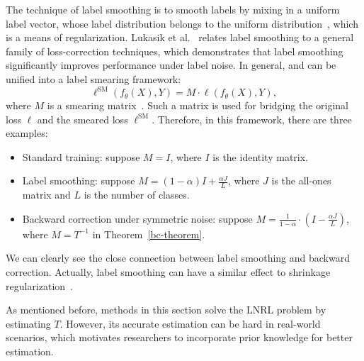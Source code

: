 \label{label-smoothing}
The technique of label smoothing is to smooth labels by mixing in a uniform label vector, whose label distribution belongs to the uniform distribution~, which is a means of regularization. Lukasik et al.~ relates label smoothing to a general family of loss-correction techniques, 
which demonstrates that label smoothing significantly improves performance under label noise. 
In general,  and  can be unified into a label smearing framework:
\begin{equation*}
\ell^{\text{SM}}(f_{\theta}(X),Y) 
= M \cdot \ell(f_{\theta}(X),Y),
\end{equation*}
where $M$ is a smearing matrix~. Such a matrix is used for bridging the original loss $\ell$ and the smeared loss $\ell^{\text{SM}}$.
Therefore, in this framework, there are three examples:
\begin{itemize}[leftmargin=*]
\item Standard training: suppose $M = I$, where $I$ is the identity matrix.
\item Label smoothing: suppose $M = (1-\alpha) I + \frac{\alpha J}{L} $, where $J$ is the all-ones matrix and $L$ is the number of classes.
\item Backward correction under symmetric noise: suppose $M = \frac{1}{1-\alpha}\cdot(I - \frac{\alpha J}{L})$, where $M = T^{-1}$ in Theorem~\ref{bc-theorem}. 
\end{itemize}
We can clearly see the close connection between label smoothing and backward correction. Actually, label smoothing can have a similar effect to 
shrinkage regularization~.

\label{sec:data:pro}
As mentioned before, 
methods in this section solve the LNRL problem by estimating $T$. 
However, its accurate estimation can be hard in real-world scenarios, 
which motivates 
researchers
to incorporate prior knowledge for better estimation.

